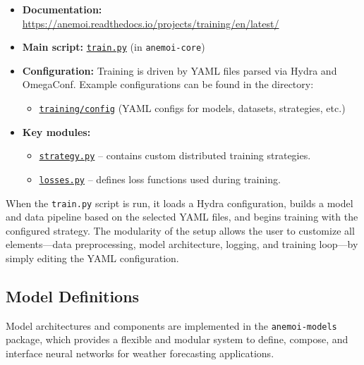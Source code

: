 \begin{itemize}
  \item \textbf{Documentation:} \url{https://anemoi.readthedocs.io/projects/training/en/latest/}
  \item \textbf{Main script:} \href{https://github.com/ecmwf/anemoi-core/blob/main/training/src/anemoi/training/train/train.py}{\texttt{train.py}} (in \texttt{anemoi-core})
  \item \textbf{Configuration:} Training is driven by YAML files parsed via Hydra and OmegaConf. Example configurations can be found in the directory:
  \begin{itemize}
    \item \href{https://github.com/ecmwf/anemoi-core/tree/main/training/src/anemoi/training/config}{\texttt{training/config}} (YAML configs for models, datasets, strategies, etc.)
  \end{itemize}
  \item \textbf{Key modules:}
  \begin{itemize}
    \item \href{https://github.com/ecmwf/anemoi-core/blob/main/training/src/anemoi/training/distributed/strategy.py}{\texttt{strategy.py}} – contains custom distributed training strategies.
    \item \href{https://github.com/ecmwf/anemoi-core/blob/main/training/src/anemoi/training/losses/losses.py}{\texttt{losses.py}} – defines loss functions used during training.
  \end{itemize}
\end{itemize}

When the \texttt{train.py} script is run, it loads a Hydra configuration, builds a model and data pipeline based on the selected YAML files, and begins training with the configured strategy. The modularity of the setup allows the user to customize all elements—data preprocessing, model architecture, logging, and training loop—by simply editing the YAML configuration.

%
\subsection{Model Definitions}

Model architectures and components are implemented in the \texttt{anemoi-models} package, which provides a flexible and modular system to define, compose, and interface neural networks for weather forecasting applications.


